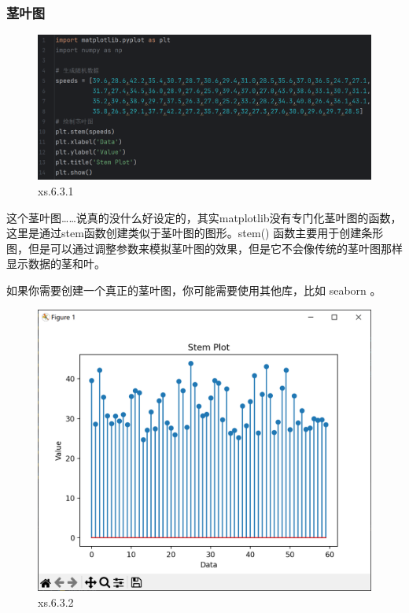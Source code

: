 \documentclass[12pt]{article}
\begin{document}
\subsubsection{茎叶图}
\begin{figure}[H]
    \centering
    \includegraphics[width=1\linewidth]{茎叶图 program1.png}
    \caption{xs.6.3.1}
    \label{fig:enter-label}
\end{figure}
这个茎叶图……说真的没什么好设定的，其实matplotlib没有专门化茎叶图的函数，这里是通过stem函数创建类似于茎叶图的图形。stem()  函数主要用于创建条形图，但是可以通过调整参数来模拟茎叶图的效果，但是它不会像传统的茎叶图那样显示数据的茎和叶。

 如果你需要创建一个真正的茎叶图，你可能需要使用其他库，比如  seaborn  。
\begin{figure}[H]
    \centering
    \includegraphics[width=0.75\linewidth]{茎叶图 Pic1.png}
    \caption{xs.6.3.2}
    \label{fig:enter-label}
\end{figure}
\end{document}
